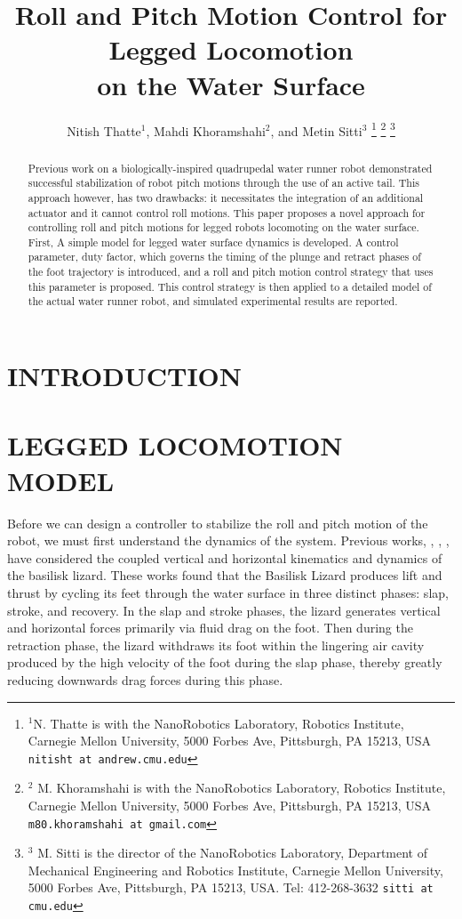 \documentclass[letterpaper, 10 pt, conference]{ieeeconf}  %
\title{\LARGE \bf
Roll and Pitch Motion Control for Legged Locomotion \\ on the Water Surface
}
\author{Nitish Thatte$^{1}$, Mahdi Khoramshahi$^{2}$, and Metin Sitti$^{3}$%
\thanks{$^{1}$N. Thatte is with the NanoRobotics Laboratory, Robotics Institute, Carnegie Mellon University, 5000 Forbes Ave, Pittsburgh, PA 15213, USA 
	{\tt\small nitisht at andrew.cmu.edu}}%
\thanks{$^{2}$ M. Khoramshahi is with the NanoRobotics Laboratory, Robotics Institute, Carnegie Mellon University, 5000 Forbes Ave, Pittsburgh, PA 15213, USA 
	{\tt\small m80.khoramshahi at gmail.com}}
\thanks{$^{3}$ M. Sitti is the director of the NanoRobotics Laboratory, Department of Mechanical Engineering and Robotics Institute, Carnegie Mellon University, 5000 Forbes Ave, Pittsburgh, PA 15213, USA. Tel: 412-268-3632
	{\tt\small sitti at cmu.edu}}
}
\begin{document}
\maketitle
\thispagestyle{empty}
\pagestyle{empty}

\begin{abstract}
	Previous work on a biologically-inspired quadrupedal water runner robot demonstrated successful stabilization of robot pitch motions through the use of an active tail. This approach however, has two drawbacks: it necessitates the integration of an additional actuator and  it cannot control roll motions. This paper proposes a novel approach for controlling roll and pitch motions for legged robots locomoting on the water surface. First, A simple model for legged water surface dynamics is developed. A control parameter, duty factor, which governs the timing of the plunge and retract phases of the foot trajectory is introduced, and a roll and pitch motion control strategy that uses this parameter is proposed. This control strategy is then applied to a detailed model of the actual water runner robot, and simulated experimental results are reported.
\end{abstract}

\section{INTRODUCTION}

\section{LEGGED LOCOMOTION MODEL}

Before we can design a controller to stabilize the roll and pitch motion of the robot, we must first understand the dynamics of the system. Previous works, \cite{glasheen1996hydrodynamic}, \cite{floyd2008design}, \cite{hsieh2004running}, have considered the coupled vertical and horizontal kinematics and dynamics of the basilisk lizard. These works found that the Basilisk Lizard produces lift and thrust by cycling its feet through the water surface in three distinct phases: slap, stroke, and recovery. In the slap and stroke phases, the lizard generates vertical and horizontal forces primarily via fluid drag on the foot. Then during the retraction phase, the lizard withdraws its foot within the lingering air cavity produced by the high velocity of the foot during the slap phase, thereby greatly reducing downwards drag forces during this phase. 
\end{document}
